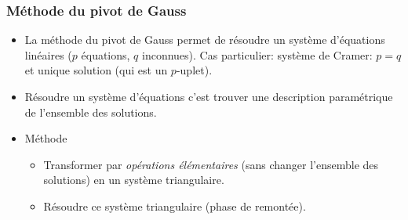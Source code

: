 
\lstset{language=Python,frame=single}

\begin{frame}
\frametitle{Méthode du pivot de Gauss}
\begin{itemize}
  \item La méthode du pivot de Gauss permet de résoudre un système d'équations linéaires ($p$ équations, $q$ inconnues).\newline
Cas particulier: système de Cramer: $p=q$ et unique solution (qui est un $p$-uplet).
  \item Résoudre un système d'équations c'est trouver une description paramétrique de l'ensemble des solutions.
  \item Méthode
\begin{itemize}
  \item Transformer par \emph{opérations élémentaires} (sans changer l'ensemble des solutions) en un système triangulaire.
  \item Résoudre ce système triangulaire (phase de remontée).
\end{itemize}
\end{itemize}
\end{frame}


